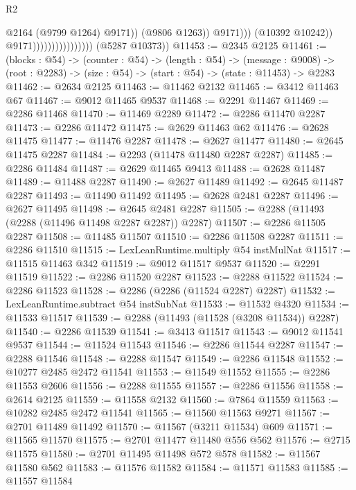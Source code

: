 \begin{lexlean}{R2}
\begin{coremodule}
                                                    @2164
                                                    (@9799 @1264)
                                                    @9171))
                                                (@9806 @1263))
                                              @9171)))
                                        (@10392 @10242))
                                      @9171))))))))))))))))
      (@5287 @10373))
@11453 := @2345 @2125
@11461 := (blocks : @54) ->
  (counter : @54) ->
  (length : @54) ->
  (message : @9008) -> (root : @2283) -> (size : @54) -> (start : @54) -> (state : @11453) -> @2283
@11462 := @2634 @2125
@11463 := @11462 @2132
@11465 := @3412 @11463 @67
@11467 := @9012 @11465 @9537
@11468 := @2291 @11467
@11469 := @2286 @11468
@11470 := @11469 @2289
@11472 := @2286 @11470 @2287
@11473 := @2286 @11472
@11475 := @2629 @11463 @62
@11476 := @2628 @11475
@11477 := @11476 @2287
@11478 := @2627 @11477
@11480 := @2645 @11475 @2287
@11484 := @2293 (@11478 @11480 @2287 @2287)
@11485 := @2286 @11484
@11487 := @2629 @11465 @9413
@11488 := @2628 @11487
@11489 := @11488 @2287
@11490 := @2627 @11489
@11492 := @2645 @11487 @2287
@11493 := @11490 @11492
@11495 := @2628 @2481 @2287
@11496 := @2627 @11495
@11498 := @2645 @2481 @2287
@11505 := @2288 (@11493 (@2288 (@11496 @11498 @2287 @2287)) @2287)
@11507 := @2286 @11505 @2287
@11508 := @11485 @11507
@11510 := @2286 @11508 @2287
@11511 := @2286 @11510
@11515 := LexLeanRuntime.multiply @54 instMulNat
@11517 := @11515 @11463 @342
@11519 := @9012 @11517 @9537
@11520 := @2291 @11519
@11522 := @2286 @11520 @2287
@11523 := @2288 @11522
@11524 := @2286 @11523
@11528 := @2286 (@2286 (@11524 @2287) @2287)
@11532 := LexLeanRuntime.subtract @54 instSubNat
@11533 := @11532 @4320
@11534 := @11533 @11517
@11539 := @2288 (@11493 (@11528 (@3208 @11534)) @2287)
@11540 := @2286 @11539
@11541 := @3413 @11517
@11543 := @9012 @11541 @9537
@11544 := @11524 @11543
@11546 := @2286 @11544 @2287
@11547 := @2288 @11546
@11548 := @2288 @11547
@11549 := @2286 @11548
@11552 := @10277 @2485 @2472 @11541
@11553 := @11549 @11552
@11555 := @2286 @11553 @2606
@11556 := @2288 @11555
@11557 := @2286 @11556
@11558 := @2614 @2125
@11559 := @11558 @2132
@11560 := @7864 @11559
@11563 := @10282 @2485 @2472 @11541
@11565 := @11560 @11563 @9271
@11567 := @2701 @11489 @11492
@11570 := @11567 (@3211 @11534) @609
@11571 := @11565 @11570
@11575 := @2701 @11477 @11480 @556 @562
@11576 := @2715 @11575
@11580 := @2701 @11495 @11498 @572 @578
@11582 := @11567 @11580 @562
@11583 := @11576 @11582
@11584 := @11571 @11583
@11585 := @11557 @11584

\end{coremodule}
\end{lexlean}
